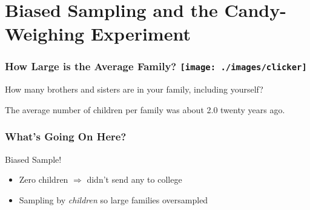 \section{Biased Sampling and the Candy-Weighing Experiment}

\begin{frame}
\frametitle{How Large is the Average Family? \hfill\texttt{[image: ./images/clicker]}}

\Large How many brothers and sisters are in your family, including yourself?

\end{frame}

\begin{frame}
\Large
\alert{The average number of children per family was about 2.0 twenty years ago.}
\end{frame}
\begin{frame}
\frametitle{What's Going On Here?}
\pause
Biased Sample!
\begin{itemize}
 	\item  Zero children $\Rightarrow$ didn't send any to college
 	\item Sampling by \emph{children} so large families \alert{oversampled}
\end{itemize}


\end{frame}

